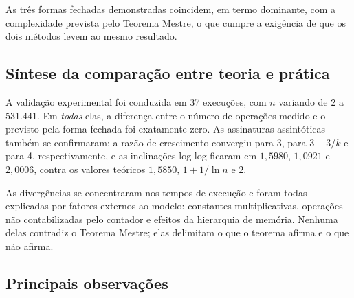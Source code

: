 \documentclass[11pt,a4paper]{article}
\begin{document}
As três formas fechadas demonstradas coincidem, em termo dominante, com a complexidade prevista pelo Teorema Mestre, o que cumpre a exigência de que os dois métodos levem ao mesmo resultado.

\subsection{Síntese da comparação entre teoria e prática}

A validação experimental foi conduzida em 37 execuções, com $n$ variando de 2 a 531.441. Em \emph{todas} elas, a diferença entre o número de operações medido e o previsto pela forma fechada foi exatamente zero. As assinaturas assintóticas também se confirmaram: a razão de crescimento convergiu para 3, para $3+3/k$ e para 4, respectivamente, e as inclinações log-log ficaram em $1{,}5980$, $1{,}0921$ e $2{,}0006$, contra os valores teóricos $1{,}5850$, $1+1/\ln n$ e $2$.

As divergências se concentraram nos tempos de execução e foram todas explicadas por fatores externos ao modelo: constantes multiplicativas, operações não contabilizadas pelo contador e efeitos da hierarquia de memória. Nenhuma delas contradiz o Teorema Mestre; elas delimitam o que o teorema afirma e o que não afirma.

\subsection{Principais observações}
\end{document}

